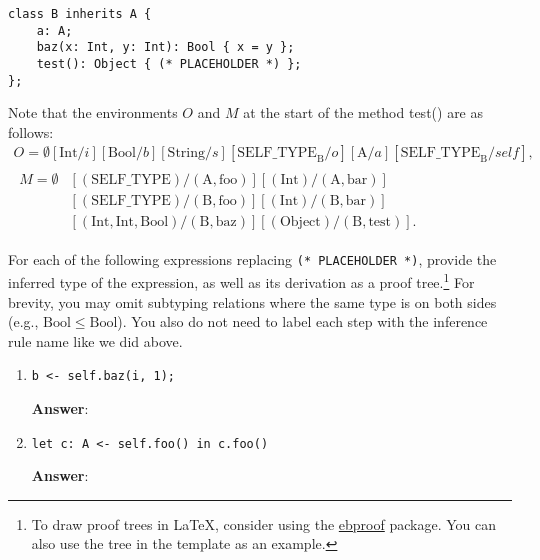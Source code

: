 \documentclass[11pt]{article}
\begin{document}
\begin{enumerate}
\begin{lstlisting}[emph={i,b,s,o,a,x,y}, basicstyle=\small]
class B inherits A {
    a: A;
    baz(x: Int, y: Int): Bool { x = y };
    test(): Object { (* PLACEHOLDER *) };
};
\end{lstlisting}
Note that the environments $O$ and $M$ at the start of the method test() are as follows:
\begin{gather*}
    O = \emptyset[\mathrm{Int}/i][\mathrm{Bool}/b][\mathrm{String}/s][\mathrm{SELF\_TYPE}_{\mathrm{B}}/o][\mathrm{A}/a][\mathrm{SELF\_TYPE}_{\mathrm{B}}/\mathit{self}], \\[2ex]
    \begin{aligned}
    M = \emptyset&[(\mathrm{SELF\_TYPE})/(\mathrm{A},\mathrm{foo})][(\mathrm{Int})/(\mathrm{A},\mathrm{bar})] \\
                 &[(\mathrm{SELF\_TYPE})/(\mathrm{B},\mathrm{foo})][(\mathrm{Int})/(\mathrm{B},\mathrm{bar})] \\
                 &[(\mathrm{Int,Int,Bool})/(\mathrm{B},\mathrm{baz})][(\mathrm{Object})/(\mathrm{B},\mathrm{test})].
    \end{aligned}
\end{gather*}

For each of the following expressions replacing \lstinline{(* PLACEHOLDER *)}, provide the inferred type of the expression, as well as its derivation as a proof tree.\footnote{To draw proof trees in \LaTeX, consider using the \href{https://ctan.org/pkg/ebproof?lang=en}{\textsf{ebproof}} package. You can also use the tree in the template as an example.} For brevity, you may omit subtyping relations where the same type is on both sides (e.g., $\mathrm{Bool} \le \mathrm{Bool}$). You also do not need to label each step with the inference rule name like we did above.

\newpage

\newcommand{\Str}{\mathrm{String}}
\newcommand{\Bool}{\mathrm{Bool}}
\newcommand{\Int}{\mathrm{Int}}
\newcommand{\A}{\mathrm{A}}
\newcommand{\B}{\mathrm{B}}
\newcommand{\ST}{\mathrm{SELF\_TYPE}}

\begin{enumerate}
    \item \lstinline[keepspaces=true, emph={s,b,i}]|b <- self.baz(i, 1);|

        \textbf{Answer}:
        \vspace{6cm}

    \item \lstinline[keepspaces=true, emph={c}]{let c: A <- self.foo() in c.foo()}

        \textbf{Answer}:
        \vspace{6cm}


\end{enumerate}
\end{enumerate}
\end{document}
